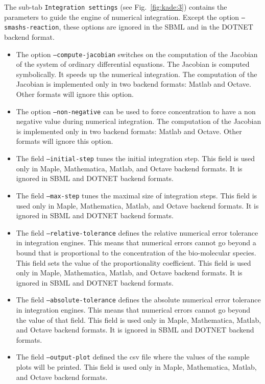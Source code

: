 \documentclass[11pt]{book}
\begin{document}
The sub-tab \texttt{Integration settings} (see Fig.~\ref{fig:kade:3}) contains the parameters to guide the engine of numerical integration. Except the option \texttt{--smashs-reaction}, these options are ignored in the SBML and in the
DOTNET backend format.

\begin{itemize}
  \item The option \texttt{--compute-jacobian} switches on the computation of the Jacobian of the system of ordinary differential equations.
  The Jacobian is computed symbolically. It speeds up the numerical integration. The computation of the Jacobian is implemented only in two backend formats:  Matlab and Octave. Other formats will ignore this option.
  \item The option \texttt{--non-negative} can be used to force concentration to have a non negative value during numerical integration.
  The computation of the Jacobian is implemented only in two backend formats:  Matlab and Octave. Other formats will ignore this option.
  \item The field \texttt{--initial-step} tunes the initial integration step.
  This field is used only in Maple, Mathematica, Matlab, and Octave backend formats.
  It is ignored in SBML and DOTNET backend formats.
  \item The field \texttt{--max-step} tunes the maximal size of integration steps. This field is used only in Maple, Mathematica, Matlab, and Octave backend formats.
  It is ignored in SBML and DOTNET backend formats.
  \item The field \texttt{--relative-tolerance} defines the relative numerical error tolerance in integration engines. This means that numerical errors cannot go beyond a bound that is proportional to the concentration of the bio-molecular species. This field sets the value of the proportionality coefficient.   This field is used only in Maple, Mathematica, Matlab, and Octave backend formats.
  It is ignored in SBML and DOTNET backend formats.
  \item The field \texttt{--absolute-tolerance} defines the absolute numerical error tolerance in integration engines. This means that numerical errors cannot go beyond the value of that field.  This field is used only in Maple, Mathematica, Matlab, and Octave backend formats. It is ignored in SBML and DOTNET backend formats.
  \item The field \texttt{--output-plot} defined the csv file where the values of the sample plots will be printed. This field is used only in Maple, Mathematica, Matlab, and Octave backend formats.

\end{itemize}
\end{document}
